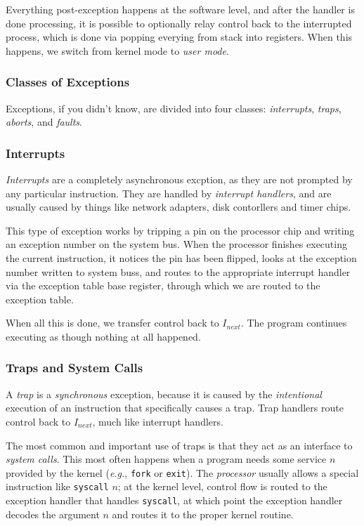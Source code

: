 \documentclass[fleqn]{article}
\begin{document}
Everything post-exception happens at the software level, and after the handler is done processing, it is possible to optionally relay control back to the interrupted process, which is done via popping everying from stack into registers. When this happens, we switch from kernel mode to \textit{user mode}.

\subsubsection{Classes of Exceptions}

Exceptions, if you didn't know, are divided into four classes: \textit{interrupts}, \textit{traps}, \textit{aborts}, and \textit{faults}.

\subsubsection*{Interrupts}

\textit{Interrupts} are a completely asynchronous excption, as they are not prompted by any particular instruction. They are handled by \textit{interrupt handlers}, and are usually caused by things like network adapters, disk contorllers and timer chips.

This type of exception works by tripping a pin on the processor chip and writing an exception number on the system bus. When the processor finishes executing the current instruction, it notices the pin has been flipped, looks at the exception number written to system buss, and routes to the appropriate interrupt handler via the exception table base register, through which we are routed to the exception table.

When all this is done, we transfer control back to $I_{next}$. The program continues executing as though nothing at all happened.

\subsubsection*{Traps and System Calls}

A \textit{trap} is a \textit{synchronous} exception, because it is caused by the \textit{intentional} execution of an instruction that specifically causes a trap. Trap handlers route control back to $I_{next}$, much like interrupt handlers.

The most common and important use of traps is that they act as an interface to \textit{system calls}. This most often happens when a program needs some service $n$ provided by the kernel (\textit{e.g.}, \texttt{fork} or \texttt{exit}). The \textit{processor} usually allows a special instruction like \texttt{syscall} $n$; at the kernel level, control flow is routed to the exception handler that handles \texttt{syscall}, at which point the exception handler decodes the argument $n$ and routes it to the proper kernel routine.
\end{document}
